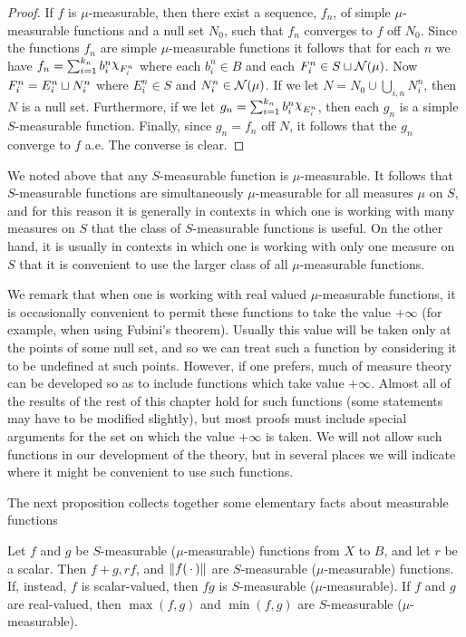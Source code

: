 \begin{proof}
If $f$ is $\mu$-measurable, then there exist a sequence, $f_n$, of simple $\mu$-measurable functions and a null set $N_0$, such that $f_n$ converges to $f$ off $N_0$. Since the functions $f_n$ are simple $\mu$-measurable functions it follows that for each $n$ we have $f_n=\sum_{i=1}^{k_n}b_i^n\idf{F_i^n}$ where each $b_i^n\in B$ and each $F_i^n\in S\sqcup{\cal N}(\mu)$. Now $F_i^n=E_i^n\sqcup N_i^n$ where $E_i^n\in S$ and $N_i^n\in{\cal N}(\mu)$. If we let $N=N_0\cup\bigcup_{i, n} N_i^n$, then $N$ is a null set. Furthermore, if we let $g_n=\sum_{i=1}^{k_n}b_i^n\idf{E_i^n}$, then each $g_n$ is a simple $S$-measurable function. Finally, since $g_n=f_n$ off $N$, it follows that the $g_n$ converge to $f$ a.e. The converse is clear.
\end{proof}

We noted above that any $S$-measurable function is $\mu$-measurable. It follows that $S$-measurable functions are simultaneously $\mu$-measurable for all measures $\mu$ on $S$, and for this reason it is generally in contexts in which one is working with many measures on $S$ that the class of $S$-measurable functions is useful. On the other hand, it is usually in contexts in which one is working with only one measure on $S$ that it is convenient to use the larger class of all $\mu$-measurable functions.

We remark that when one is working with real valued $\mu$-measurable functions, it is occasionally convenient to permit these functions to take the value $+\infty$ (for example, when using Fubini's theorem). Usually this value will be taken only at the points of some null set, and so we can treat such a function by considering it to be undefined at such points. However, if one prefers, much of measure theory can be developed so as to include functions which take value $+\infty$. Almost all of the results of the rest of this chapter hold for such functions (some statements may have to be modified slightly), but most proofs must include special arguments for the set on which the value $+\infty$ is taken. We will not allow such functions in our development of the theory, but in several places we will indicate where it might be convenient to use such functions.

The next proposition collects together some elementary facts about measurable functions

\begin{proposition}\label{prop:sum product of meas function}
Let $f$ and $g$ be $S$-measurable ($\mu$-measurable) functions from $X$ to $B$, and let $r$ be a scalar. Then $f+g, rf$, and $\norm{f(\,\cdot\,)}$ are $S$-measurable ($\mu$-measurable) functions. If, instead, $f$ is scalar-valued, then $fg$ is $S$-measurable ($\mu$-measurable). If $f$ and $g$ are real-valued, then $\max(f, g)$ and $\min(f, g)$ are $S$-measurable ($\mu$-measurable).
\end{proposition}

